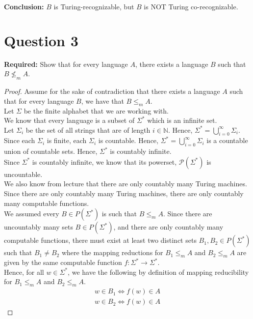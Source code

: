 \documentclass[12pt]{article}
\newcommand{\N}{\mathbb{N}}
\begin{document}
\textbf{Conclusion:} $B$ is Turing-recognizable, but $B$ is NOT Turing co-recognizable.

\newpage

\section*{Question 3}

\textbf{Required:} Show that for every language $A$, there exists a language $B$ such that $B \not \leq_m A$. 

\begin{proof}
Assume for the sake of contradiction that there exists a language $A$ such that for every language $B$, we have that $B \leq_m A$. \\

Let $\Sigma$ be the finite alphabet that we are working with. \\

We know that every language is a subset of $\Sigma^*$ which is an infinite set. \\

Let $\Sigma_{i}$ be the set of all strings that are of length $i \in \N$. Hence, $\Sigma^* = \bigcup_{i = 0}^\infty \Sigma_i$. Since each $\Sigma_i$ is finite, each $\Sigma_i$ is countable. Hence, $\Sigma^* = \bigcup_{i = 0}^\infty \Sigma_i$ is a countable union of countable sets. Hence, $\Sigma^*$ is countably infinite. \\

Since $\Sigma^*$ is countably infinite, we know that its powerset, $\mathcal{P}(\Sigma^*)$ is uncountable. \\

We also know from lecture that there are only countably many Turing machines. Since there are only countably many Turing machines, there are only countably many computable functions. \\

We assumed every $B \in P(\Sigma^*)$ is such that $B \leq_m A$. Since there are uncountably many sets $B \in P(\Sigma^*)$, and there are only countably many computable functions, there must exist at least two distinct sets $B_1, B_2 \in P(\Sigma^*)$ such that $B_1 \neq B_2$ where the mapping reductions for $B_1 \leq_m A$ and $B_2 \leq_m A$ are given by the same computable function $f: \Sigma^* \rightarrow \Sigma^*$. \\

Hence, for all $w \in \Sigma^*$, we have the following by definition of mapping reducibility for $B_1 \leq_m A$ and $B_2 \leq_m A$. 
\begin{align}
w \in B_1 \Leftrightarrow f(w) \in A
\end{align}
\begin{align}
w \in B_2 \Leftrightarrow f(w) \in A
\end{align}


\end{proof}
\end{document}
